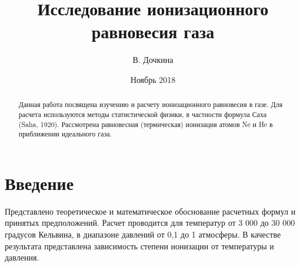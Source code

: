 \documentclass[letterpaper,12pt]{article} %
\begin{document}
\title{Исследование ионизационного равновесия газа}
\author{В. Дочкина}
\date{Ноябрь 2018}
\maketitle

\begin{abstract}
Данная работа посвящена изучению и расчету ионизационного равновесия в газе. Для расчета используются методы статистической физики, в частности формула Саха (Saha, 1920). 
Рассмотрена равновесная (термическая) ионизация атомов Ne и He в приближении идеального газа. 
\end{abstract}


\section{Введение}

Представлено теоретическое и математическое обоснование расчетных формул и принятых предположений. 
Расчет проводится для температур от 3 000 до 30 000 градусов Кельвина, в диапазоне давлений от 0,1 до 1 атмосферы. 
В качестве результата представлена зависимость степени ионизации от температуры и давления.
\end{document}
